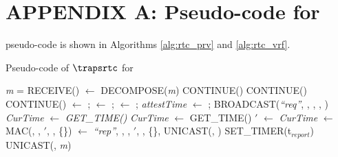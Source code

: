 \newpage %

\section*{APPENDIX A: Pseudo-code for \trapsrtc} \label{sec:code-rtc}
%
\trapsrtc pseudo-code is shown in Algorithms \ref{alg:rtc_prv} and \ref{alg:rtc_vrf}.

\begin{algorithm}[hbt!]
\footnotesize
\caption{Pseudo-code of $\boldsymbol{\trapsrtc}$ for \prv}\label{alg:rtc_prv}
    \begin{algorithmic}[1]
        \State \textit{m} = RECEIVE()
            \State [\snd, \hashind, \hash, \attesttime] $\gets$ DECOMPOSE(\textit{m})
            \If {$\curhashind <= \hashind$}
                \State CONTINUE() 
            \EndIf
                \State CONTINUE() 
            \EndIf
                \State CONTINUE()
            \EndIf
             \State \parent $\gets$ \snd; \curhashind $\gets$ \hashind; \curhash $\gets$ \hash; \textit{attestTime} $\gets$ \attesttime;
             \State BROADCAST(\textit{``req''}, \devid, \curhashind, \curhash, \attesttime)
             \State \textit{CurTime} $\gets$ \textit{GET\_TIME()} 
              
             \State \textit{CurTime} $\gets$ GET\_TIME()
             \EndWhile
             \State \attesttime$'$ $\gets$ \textit{CurTime}
             \State \Authrep $\gets$ MAC(\key, \parent, \attesttime$'$, \hash, \{\lmt\})
             \State \Attrep $\gets$ \textit{``rep''}, \devid, \parent, \attesttime$'$,  \hash, \{\lmt\}, \Authrep
             \State UNICAST(\parent, \Attrep)
             \State SET\_TIMER(\height*t$_{report}$)
        \EndIf
                     \State UNICAST(\parent, \textit{m})
                 \EndIf
        \EndIf
    \EndWhile
    \end{algorithmic}
\end{algorithm}


